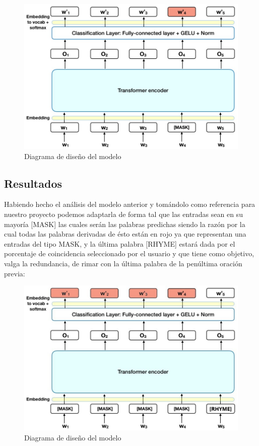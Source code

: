 \documentclass[12pt, a4paper, titlepage]{report}
\begin{document}
		\begin{figure}[H]
			\includegraphics[width=12cm]{./imagenes/Disenio/Iteracion_3/bert_preoutput_model.jpg}
			\centering 
			\caption{Diagrama de diseño del modelo}
		\end{figure}
		
		\subsection{Resultados} %
		
		Habiendo hecho el análisis del modelo anterior y tomándolo como referencia para nuestro proyecto podemos adaptarla de forma tal que las entradas sean en su mayoría [MASK] las cuales serán las palabras predichas siendo la razón por la cual todas las palabras derivadas de ésto están en rojo ya que representan una entradas del tipo MASK, y la última palabra [RHYME] estará dada por el porcentaje de coincidencia seleccionado por el usuario y que tiene como objetivo, valga la redundancia, de rimar con la última palabra de la penúltima oración previa: 
		\begin{figure}[H]
			\includegraphics[width=12cm]{./imagenes/Disenio/Iteracion_3/bert_output_model.jpg}
			\centering 
			\caption{Diagrama de diseño del modelo}
		\end{figure}
		
\end{document}
